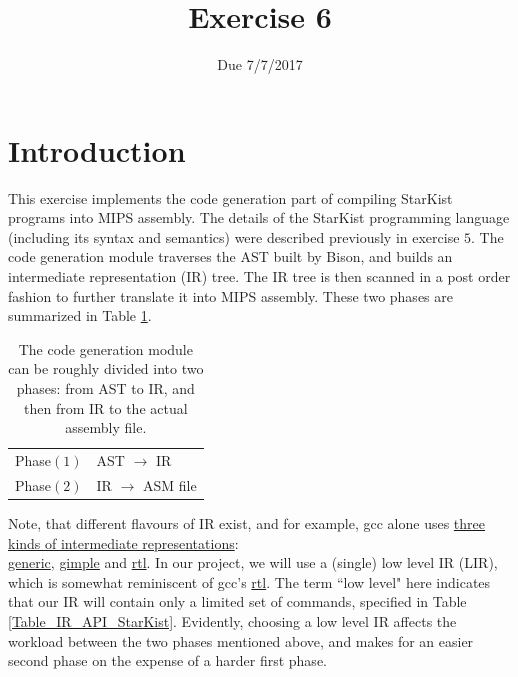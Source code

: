 \documentclass{article}
\begin{document}
\title{Exercise 6}

\date{Due 7/7/2017}

\maketitle

\section{Introduction}
This exercise implements the code generation part of compiling StarKist
programs into MIPS assembly. The details of the StarKist programming language
(including its syntax and semantics) were described previously in exercise $5$.
The code generation module traverses the AST built by Bison,
and builds an intermediate representation (IR) tree.
The IR tree is then scanned in a post order fashion
to further translate it into MIPS assembly.
These two phases are summarized in Table \ref{Table_The_Two_Phases_Of_Code_Gen}.
\begin{table}[h]
\centering
\begin{tabular}{ l l}
  Phase$(1)$   & AST $\rightarrow$ IR       \\
  Phase$(2)$   & IR  $\rightarrow$ ASM file \\
\end{tabular}
\caption{
The code generation module can be roughly divided into two phases:
from AST to IR, and then from IR to the actual assembly file.
\label{Table_The_Two_Phases_Of_Code_Gen}}
\end{table}
Note, that different flavours of IR exist, and for example,
gcc alone uses \href{https://gcc.gnu.org/onlinedocs/gccint/Tree-SSA.html#Tree-SSA}
{three kinds of intermediate representations}:\\
\href{https://gcc.gnu.org/onlinedocs/gccint/GENERIC.html#GENERIC}{generic},
\href{https://gcc.gnu.org/onlinedocs/gccint/GIMPLE.html#GIMPLE}{gimple} and
\href{https://gcc.gnu.org/onlinedocs/gccint/RTL.html#RTL}{rtl}.
In our project, we will use a (single) low level IR (LIR),
which is somewhat reminiscent of gcc's
\href{https://gcc.gnu.org/onlinedocs/gccint/RTL.html#RTL}{rtl}.
The term ``low level" here indicates that our IR will contain only a limited set
of commands, specified in Table \ref{Table_IR_API_StarKist}.
Evidently, choosing a low level IR affects the workload between the two phases
mentioned above, and makes for an easier second phase on the expense of
a harder first phase.
\end{document}
